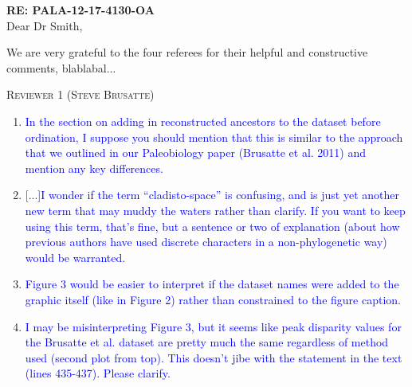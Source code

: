 \documentclass[12pt,letterpaper]{article}
\renewcommand{\section}[1]{%
\bigskip
\begin{center}
\begin{Large}
\normalfont\scshape #1
\medskip
\end{Large}
\end{center}}
\begin{document}
\textbf{RE: PALA-12-17-4130-OA}\\
\bigskip
Dear Dr Smith,\\
\bigskip

We are very grateful to the four referees for their helpful and constructive comments, blablabal...




%
%


\section{Reviewer 1 (Steve Brusatte)}

\begin{enumerate}

\item{\textcolor{blue}{In the section on adding in reconstructed ancestors to the dataset before ordination, I suppose you should mention that this is similar to the approach that we outlined in our Paleobiology paper (Brusatte et al. 2011) and mention any key differences.}}



\item{\textcolor{blue}{[...]I wonder if the term ``cladisto-space'' is confusing, and is just yet another new term that may muddy the waters rather than clarify. If you want to keep using this term, that’s fine, but a sentence or two of explanation (about how previous authors have used discrete characters in a non-phylogenetic way) would be warranted.}}


\item{\textcolor{blue}{Figure 3 would be easier to interpret if the dataset names were added to the graphic itself (like in Figure 2) rather than constrained to the figure caption.}}



\item{\textcolor{blue}{I may be misinterpreting Figure 3, but it seems like peak disparity values for the Brusatte et al. dataset are pretty much the same regardless of method used (second plot from top). This doesn’t jibe with the statement in the text (lines 435-437). Please clarify.}}

\end{enumerate}
\end{document}

